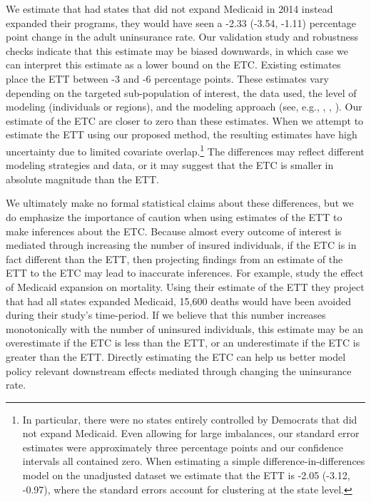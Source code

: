 \documentclass[aoas]{imsart}
\theoremstyle{plain}
\theoremstyle{remark}
\begin{document}
We estimate that had states that did not expand Medicaid in 2014 instead expanded their programs, they would have seen a -2.33 (-3.54, -1.11) percentage point change in the adult uninsurance rate. Our validation study and robustness checks indicate that this estimate may be biased downwards, in which case we can interpret this estimate as a lower bound on the ETC. Existing estimates place the ETT between -3 and -6 percentage points. These estimates vary depending on the targeted sub-population of interest, the data used, the level of modeling (individuals or regions), and the modeling approach (see, e.g., \cite{courtemanche2017early}, \cite{kaestner2017effects}, \cite{frean2017premium}). Our estimate of the ETC are closer to zero than these estimates. When we attempt to estimate the ETT using our proposed method, the resulting estimates have high uncertainty due to limited covariate overlap.\footnote{In particular, there were no states entirely controlled by Democrats that did not expand Medicaid. Even allowing for large imbalances, our standard error estimates were approximately three percentage points and our confidence intervals all contained zero. When estimating a simple difference-in-differences model on the unadjusted dataset we estimate that the ETT is -2.05 (-3.12, -0.97), where the standard errors account for clustering at the state level.\label{footnote_did}} The differences may reflect different modeling strategies and data, or it may suggest that the ETC is smaller in absolute magnitude than the ETT.

We ultimately make no formal statistical claims about these differences, but we do emphasize the importance of caution when using estimates of the ETT to make inferences about the ETC. Because almost every outcome of interest is mediated through increasing the number of insured individuals, if the ETC is in fact different than the ETT, then projecting findings from an estimate of the ETT to the ETC may lead to inaccurate inferences. For example, \cite{miller2019medicaid} study the effect of Medicaid expansion on mortality. Using their estimate of the ETT they project that had all states expanded Medicaid, 15,600 deaths would have been avoided during their study's time-period. If we believe that this number increases monotonically with the number of uninsured individuals, this estimate may be an overestimate if the ETC is less than the ETT, or an underestimate if the ETC is greater than the ETT. Directly estimating the ETC can help us better model policy relevant downstream effects mediated through changing the uninsurance rate. 
\end{document}
